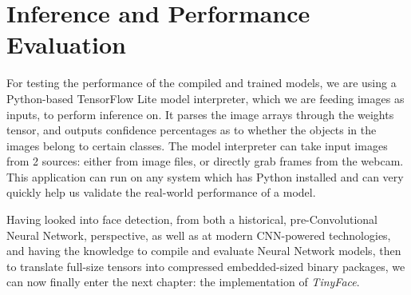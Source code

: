\section{Inference and Performance Evaluation}
For testing the performance of the compiled and trained models, we are using a Python-based TensorFlow Lite model interpreter, which we are feeding images as inputs, to perform inference on. It parses the image arrays through the weights tensor, and outputs confidence percentages as to whether the objects in the images belong to certain classes. The model interpreter can take input images from 2 sources: either from image files, or directly grab frames from the webcam. This application can run on any system which has Python installed and can very quickly help us validate the real-world performance of a model. \par
Having looked into face detection, from both a historical, pre-Convolutional Neural Network, perspective, as well as at modern CNN-powered technologies, and having the knowledge to compile and evaluate Neural Network models, then to translate full-size tensors into compressed embedded-sized binary packages, we can now finally enter the next chapter: the implementation of \textit{TinyFace}.
